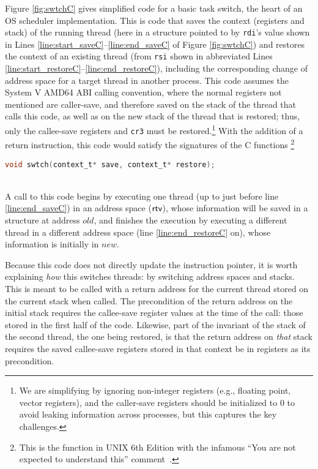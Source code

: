 Figure \ref{fig:swtchC} gives simplified code for a basic task switch, the heart of an OS scheduler implementation. This is code that saves the context (registers and stack)
of the running thread (here in a structure pointed to by \lstinline|rdi|'s value shown in Lines \ref{line:start_saveC}--\ref{line:end_saveC} of Figure \ref{fig:swtchC}) and restores the context of 
an existing thread (from \lstinline|rsi| shown in abbreviated Lines \ref{line:start_restoreC}--\ref{line:end_restoreC}), including the corresponding change of address space for a target thread in another process.
This code assumes the System V AMD64 ABI calling convention, where the normal registers not mentioned are caller-save, and therefore saved on the stack of the thread
that calls this code, as well as on the new stack of the thread that is restored; thus, only the callee-save registers and \texttt{cr3} must be
restored.\footnote{We are simplifying by ignoring non-integer registers (e.g., floating point, vector registers),
and the caller-save registers should be initialized to 0 to avoid leaking information across processes, but this captures the key challenges.}
With the addition of a return instruction, this code would satisfy the signatures of the C functions \footnote{This is the function in UNIX 6th Edition 
with the infamous ``You are not expected to understand this'' comment~\cite{lions1996lions}.}
\centerline{\lstinline[language=C]|void swtch(context_t* save, context_t* restore);|}\\
A call to this code begins by executing one thread (up to just before line \ref{line:end_saveC}) in an address space ($\textsf{rtv}$), whose information will be saved in a structure at address $old$,
and finishes the execution by executing a different thread in a different address space (line \ref{line:end_restoreC} on), whose information is initially in $new$.

Because this code does not directly update the instruction pointer, it is worth explaining \emph{how} this switches threads: by switching address spaces and stacks. 
This is meant to be called with a return address for the current thread stored on the current stack when called. 
The precondition of the return address on the initial stack requires the callee-save register values at the time of the call: those stored in the first
half of the code.
Likewise, part of the invariant of the stack of the second thread, the one being restored, is that the return address on \emph{that} stack requires the saved callee-save registers stored in that context be in registers as its precondition.

